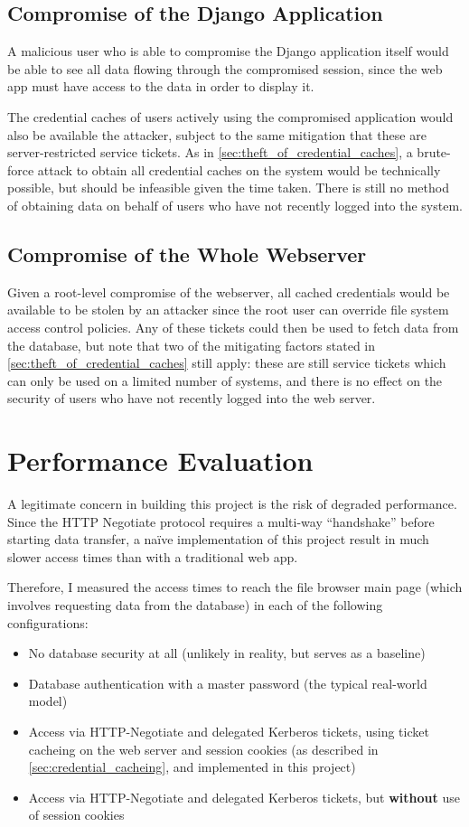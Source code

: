 \documentclass[12pt]{report}
\begin{document}
\subsection{Compromise of the Django Application}
A malicious user who is able to compromise the Django application itself would be able to see all data flowing through the compromised session, since the web app must have access to the data in order to display it.

The credential caches of users actively using the compromised application would also be available the attacker, subject to the same mitigation that these are server-restricted service tickets. As in \autoref{sec:theft_of_credential_caches}, a brute-force attack to obtain all credential caches on the system would be technically possible, but should be infeasible given the time taken. There is still no method of obtaining data on behalf of users who have not recently logged into the system.

\subsection{Compromise of the Whole Webserver}
Given a root-level compromise of the webserver, all cached credentials would be available to be stolen by an attacker since the root user can override file system access control policies. Any of these tickets could then be used to fetch data from the database, but note that two of the mitigating factors stated in \autoref{sec:theft_of_credential_caches} still apply: these are still service tickets which can only be used on a limited number of systems, and there is no effect on the security of users who have not recently logged into the web server.

\section{Performance Evaluation}
\label{sec:performance_evaluation}
A legitimate concern in building this project is the risk of degraded performance. Since the HTTP Negotiate protocol requires a multi-way ``handshake'' before starting data transfer, a na\"ive implementation of this project result in much slower access times than with a traditional web app.

Therefore, I measured the access times to reach the file browser main page (which involves requesting data from the database) in each of the following configurations:
\begin{itemize}
\item
  No database security at all (unlikely in reality, but serves as a baseline)
\item
  Database authentication with a master password (the typical real-world model)
\item
  Access via HTTP-Negotiate and delegated Kerberos tickets, using ticket cacheing on the web server and session cookies (as described in \autoref{sec:credential_cacheing}, and implemented in this project)
\item
  Access via HTTP-Negotiate and delegated Kerberos tickets, but \textbf{without} use of session cookies
\end{itemize}
\end{document}
